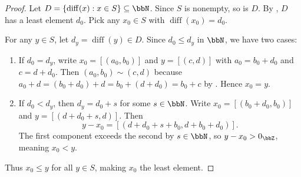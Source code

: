 \begin{proof}
Let $D = \{\operatorname{diff}(x) : x \in S\} \subseteq \bbN$. Since $S$ is nonempty, so is $D$. By , $D$ has a least element $d_0$. Pick any $x_0 \in S$ with $\operatorname{diff}(x_0) = d_0$.

For any $y \in S$, let $d_y = \operatorname{diff}(y) \in D$. Since $d_0 \leq d_y$ in $\bbN$, we have two cases:
\begin{enumerate}
    \item If $d_0 = d_y$, write $x_0 = [(a_0, b_0)]$ and $y = [(c, d)]$ with $a_0 = b_0 + d_0$ and $c = d + d_0$. Then $(a_0, b_0) \sim (c, d)$ because $a_0 + d = (b_0 + d_0) + d = b_0 + (d + d_0) = b_0 + c$ by . Hence $x_0 = y$.
    \item If $d_0 < d_y$, then $d_y = d_0 + s$ for some $s \in \bbN$. Write $x_0 = [(b_0 + d_0, b_0)]$ and $y = [(d + d_0 + s, d)]$. Then
    $$y - x_0 = [(d + d_0 + s + b_0, d + b_0 + d_0)].$$
    The first component exceeds the second by $s \in \bbN$, so $y - x_0 > 0_\bbZ$, meaning $x_0 < y$.
\end{enumerate}

Thus $x_0 \leq y$ for all $y \in S$, making $x_0$ the least element.
\end{proof}
